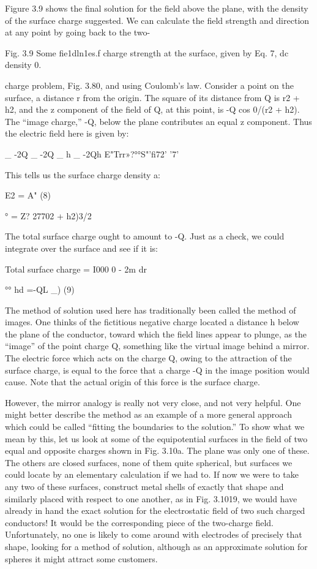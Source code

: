 Figure 3.9 shows the final solution for the field above the plane,
with the density of the surface charge suggested. We can calculate
the field strength and direction at any point by going back to the two-

    

 

Fig. 3.9 Some fie1dln1es.f charge
strength at the surface, given by Eq. 7, dc
density 0.

charge problem, Fig. 3.80, and using Coulomb's law. Consider a
point on the surface, a distance r from the origin. The square of its
distance from Q is r2 + h2, and the z component of the field of Q,
at this point, is -Q cos 0/(r2 + h2). The ``image charge,'' -Q,
below the plane contributes an equal z component. Thus the electric
field here is given by:

_ -2Q _ -2Q _ h _ -2Qh
E"Trr»?°°S"'fi72'  '7'

This tells us the surface charge density a:

E2 = A" (8)

° = Z? 27702 + h2)3/2

The total surface charge ought to amount to -Q. Just as a check,
we could integrate over the surface and see if it is:

Total surface charge = I000 0 - 2m dr

°° hd
=-QL  _) (9)

The method of solution used here has traditionally been called
the method of images. One thinks of the fictitious negative charge
located a distance h below the plane of the conductor, toward which
the field lines appear to plunge, as the ``image'' of the point charge Q,
something like the virtual image behind a mirror. The electric force
which acts on the charge Q, owing to the attraction of the surface
charge, is equal to the force that a charge -Q in the image position
would cause. Note that the actual origin of this force is the surface
charge.

However, the mirror analogy is really not very close, and not very
helpful. One might better describe the method as an example of a
more general approach which could be called ``fitting the boundaries
to the solution.'' To show what we mean by this, let us look at some
of the equipotential surfaces in the field of two equal and opposite
charges shown in Fig. 3.10a. The plane was only one of these. The
others are closed surfaces, none of them quite spherical, but surfaces
we could locate by an elementary calculation if we had to. If now
we were to take any two of these surfaces, construct metal shells of
exactly that shape and similarly placed with respect to one another,
as in Fig. 3.1019, we would have already in hand the exact solution
for the electrostatic field of two such charged conductors! It would
be the corresponding piece of the two-charge field. Unfortunately,
no one is likely to come around with electrodes of precisely that
shape, looking for a method of solution, although as an approximate
solution for spheres it might attract some customers.

